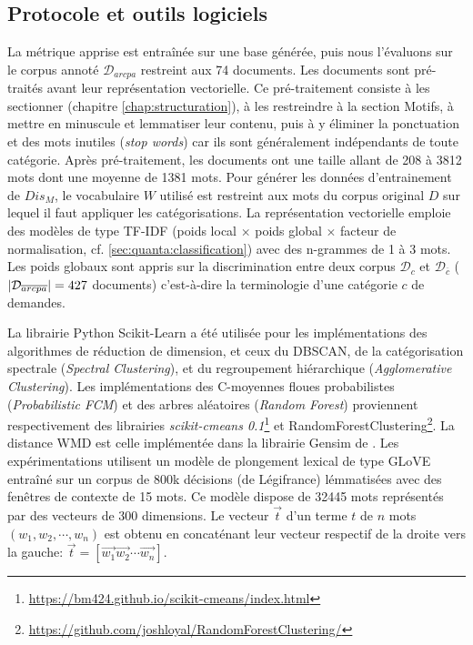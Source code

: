 \subsection{Protocole et outils logiciels}
La métrique apprise est entraînée sur une base générée, puis nous l'évaluons sur le corpus annoté $\mathcal{D}_{arcpa}$ restreint aux 74 documents.  Les documents sont pré-traités avant leur représentation vectorielle. Ce pré-traitement consiste à les  sectionner (chapitre \ref{chap:structuration}), à les restreindre à la section Motifs, à mettre en minuscule et lemmatiser leur contenu, puis à y éliminer la ponctuation et des mots inutiles (\textit{stop words})  car ils sont généralement indépendants de toute catégorie. Après pré-traitement, les documents ont une taille allant de 208 à 3812 mots dont une moyenne de 1381 mots. Pour générer les données  d'entrainement de $Dis_M$, le vocabulaire $W$ utilisé est restreint aux mots du corpus original $D$ sur lequel il faut appliquer les catégorisations. La représentation vectorielle emploie des modèles de type TF-IDF (poids local $\times$ poids global $\times$ facteur de normalisation, cf. \ref{sec:quanta:classification}) avec des n-grammes de 1 à 3 mots. %
Les poids globaux sont appris sur la discrimination entre deux corpus $\mathcal{D}_{c}$ et $\mathcal{D}_{\overline{c}}$ (${\vert\mathcal{D}_{\overline{arcpa}}\vert} = 427$ documents) c'est-à-dire la terminologie d'une catégorie $c$ de demandes.

 La librairie Python Scikit-Learn \citep{Pedregosa2011sklearn} a été utilisée pour les implémentations des algorithmes de réduction de dimension, et ceux du DBSCAN, de la catégorisation spectrale (\textit{Spectral Clustering}), et du regroupement hiérarchique (\textit{Agglomerative Clustering}). Les implémentations des C-moyennes floues probabilistes (\textit{Probabilistic FCM}) et des arbres aléatoires (\textit{Random Forest}) proviennent respectivement des librairies \textit{scikit-cmeans 0.1}\footnote{\url{https://bm424.github.io/scikit-cmeans/index.html}} et RandomForestClustering\footnote{\url{https://github.com/joshloyal/RandomForestClustering/}}. La distance WMD est celle implémentée dans la librairie Gensim de \citet{rehurek2010gensim}. Les expérimentations utilisent un modèle de plongement lexical de type GLoVE  \citep{pennington2014glove} entraîné sur un corpus de 800k décisions (de Légifrance) lémmatisées avec des fenêtres de contexte de 15 mots. Ce modèle dispose de 32445 mots représentés par des vecteurs de 300 dimensions. Le vecteur $\vec{t}$ d'un terme $t$ de $n$ mots $(w_1, w_2, \cdots, w_n)$ est obtenu en concaténant leur vecteur respectif de la droite vers la gauche: $\vec{t}=[\vec{w_1}\vec{w_2}\cdots \vec{w_n}]$.

